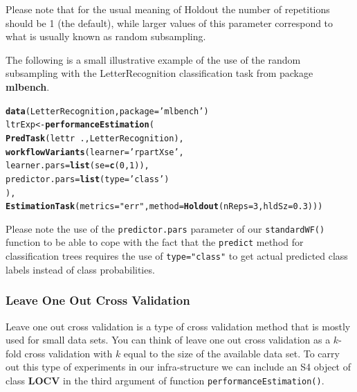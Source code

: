 \documentclass[10pt,a4paper]{article}\usepackage[]{graphicx}\usepackage[]{color}
\makeatletter
\newcommand{\hlnum}[1]{\textcolor[rgb]{0.686,0.059,0.569}{#1}}%
\newcommand{\hlstr}[1]{\textcolor[rgb]{0.192,0.494,0.8}{#1}}%
\newcommand{\hlopt}[1]{\textcolor[rgb]{0,0,0}{#1}}%
\newcommand{\hlstd}[1]{\textcolor[rgb]{0.345,0.345,0.345}{#1}}%
\newcommand{\hlkwb}[1]{\textcolor[rgb]{0.69,0.353,0.396}{#1}}%
\newcommand{\hlkwc}[1]{\textcolor[rgb]{0.333,0.667,0.333}{#1}}%
\newcommand{\hlkwd}[1]{\textcolor[rgb]{0.737,0.353,0.396}{\textbf{#1}}}%
\newenvironment{kframe}{%
 \def\at@end@of@kframe{}%
 \ifinner\ifhmode%
  \def\at@end@of@kframe{\end{minipage}}%
  \begin{minipage}{\columnwidth}%
 \fi\fi%
 \def\FrameCommand##1{\hskip\@totalleftmargin \hskip-\fboxsep
 \colorbox{shadecolor}{##1}\hskip-\fboxsep
     \hskip-\linewidth \hskip-\@totalleftmargin \hskip\columnwidth}%
 \MakeFramed {\advance\hsize-\width
   \@totalleftmargin\z@ \linewidth\hsize
   \@setminipage}}%
 {\par\unskip\endMakeFramed%
 \at@end@of@kframe}
\newenvironment{knitrout}{}{} %
\makeatother
\begin{document}
Please note that for the usual meaning of Holdout the number of repetitions should be 1 (the default), while larger values of this parameter correspond to what is usually known as random subsampling.

The following is a small illustrative example of the use of the
random subsampling with the LetterRecognition classification task from package
\textbf{mlbench}.

\begin{knitrout}\footnotesize
{}\color{fgcolor}\begin{kframe}
\begin{alltt}
\hlkwd{data}\hlstd{(LetterRecognition,}\hlkwc{package}\hlstd{=}\hlstr{'mlbench'}\hlstd{)}
\hlstd{ltrExp} \hlkwb{<-} \hlkwd{performanceEstimation}\hlstd{(}
    \hlkwd{PredTask}\hlstd{(lettr} \hlopt{~} \hlstd{.,LetterRecognition),}
    \hlkwd{workflowVariants}\hlstd{(}\hlkwc{learner}\hlstd{=}\hlstr{'rpartXse'}\hlstd{,}
                     \hlkwc{learner.pars}\hlstd{=}\hlkwd{list}\hlstd{(}\hlkwc{se}\hlstd{=}\hlkwd{c}\hlstd{(}\hlnum{0}\hlstd{,}\hlnum{1}\hlstd{)),}
                     \hlkwc{predictor.pars}\hlstd{=}\hlkwd{list}\hlstd{(}\hlkwc{type}\hlstd{=}\hlstr{'class'}\hlstd{)}
                     \hlstd{),}
    \hlkwd{EstimationTask}\hlstd{(}\hlkwc{metrics}\hlstd{=}\hlstr{"err"}\hlstd{,}\hlkwc{method}\hlstd{=}\hlkwd{Holdout}\hlstd{(}\hlkwc{nReps}\hlstd{=}\hlnum{3}\hlstd{,}\hlkwc{hldSz}\hlstd{=}\hlnum{0.3}\hlstd{)))}
\end{alltt}
\end{kframe}
\end{knitrout}

Please note the use of the \texttt{predictor.pars} parameter of our
\texttt{standardWF()} function to be able to cope with the fact that
the \texttt{predict} method for classification trees requires the use
of \texttt{type="class"} to get actual predicted class labels instead
of class probabilities.

\subsubsection{Leave One Out Cross Validation}

Leave one out cross validation is a type of cross validation method
that is mostly used for small data sets. You can think of leave one
out cross validation as a $k$-fold cross validation with $k$ equal to
the size of the available data set. To carry out this type of
experiments in our infra-structure we can include an S4 object of
class \textbf{LOCV} in the third argument of function
\texttt{performanceEstimation()}.
\end{document}
